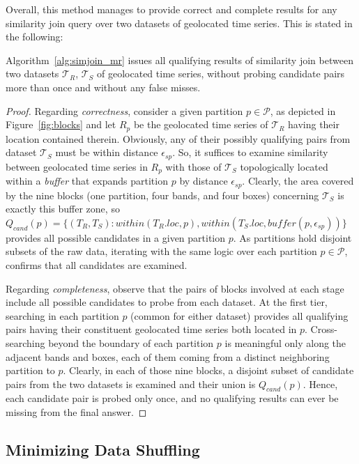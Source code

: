 Overall, this method manages to provide correct and complete results for any similarity join query over two datasets of geolocated time series. This is stated in the following:
\begin{mylemma}
Algorithm~\ref{alg:simjoin_mr} issues all qualifying results of similarity join between two datasets $\mathcal{T}_{R}$, $\mathcal{T}_{S}$ of geolocated time series, without probing candidate pairs more than once and without any false misses.
\end{mylemma}
\vspace{-3mm}
\begin{proof} Regarding {\em correctness}, consider a given partition $p \in \mathcal{P}$, as depicted in Figure~\ref{fig:blocks} and let $R_{p}$ be the geolocated time series of $\mathcal{T}_{R}$ having their location contained therein. Obviously, any of their possibly qualifying pairs from dataset $\mathcal{T}_{S}$ must be within distance $\epsilon_{sp}$. So, it suffices to examine similarity between geolocated time series in $R_{p}$ with those of $\mathcal{T}_{S}$ topologically located within a {\em buffer} that expands partition $p$ by distance $\epsilon_{sp}$. Clearly, the area covered by the nine blocks (one partition, four bands, and four boxes) concerning $\mathcal{T}_{S}$ is exactly this buffer zone, so $Q_{cand}(p) = \{ (T_{R}, T_{S} ): within(T_{R}.loc, p), within(T_{S}.loc, buffer(p, \epsilon_{sp})) \}$ provides all possible candidates in a given partition $p$. As partitions hold disjoint subsets of the raw data, iterating with the same logic over each partition $p \in \mathcal{P}$, confirms that all candidates are examined. 

Regarding {\em completeness}, observe that the pairs of blocks involved at each stage include all possible candidates to probe from each dataset. At the first tier, searching in each partition $p$ (common for either dataset) provides all qualifying pairs having their constituent geolocated time series both located in $p$. Cross-searching beyond the boundary of each partition $p$ is meaningful only along the adjacent bands and boxes, each of them coming from a distinct neighboring partition to $p$. Clearly, in each of those nine blocks, a disjoint subset of candidate pairs from the two datasets is examined and their union is $Q_{cand}(p)$. Hence, each candidate pair is probed only once, and no qualifying results can ever be missing from the final answer.
\end{proof}

\subsection{Minimizing Data Shuffling}
\label{subsec:optimized}

